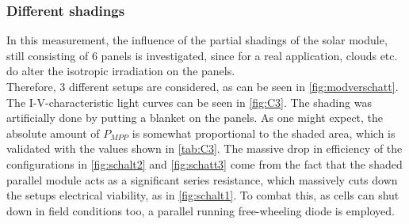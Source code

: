 \documentclass[english,  %
parskip=full,  %
headsepline]{scrartcl}
\begin{document}
\subsubsection{Different shadings}
In this measurement, the influence of the partial shadings of the solar module, still consisting of 6 panels is investigated, since for a real application, clouds etc. do alter the isotropic irradiation on the panels.\\
Therefore, 3 different setups are considered, as can be seen in \cref{fig:modverschatt}.\\
The I-V-characteristic light curves can be seen in \cref{fig:C3}. The shading was artificially done by putting a blanket on the panels. As one might expect, the absolute amount of $P_{MPP}$ is somewhat proportional to the shaded area, which is validated with the values shown in \cref{tab:C3}. 
The massive drop in efficiency of the configurations in \cref{fig:schalt2} and \cref{fig:schatt3} come from the fact that the shaded parallel module acts as a significant series resistance, which massively cuts down the setups electrical viability, as in \cref{fig:schalt1}. To combat this, as cells can shut down in field conditions too, a parallel running free-wheeling diode is employed.
\end{document}
